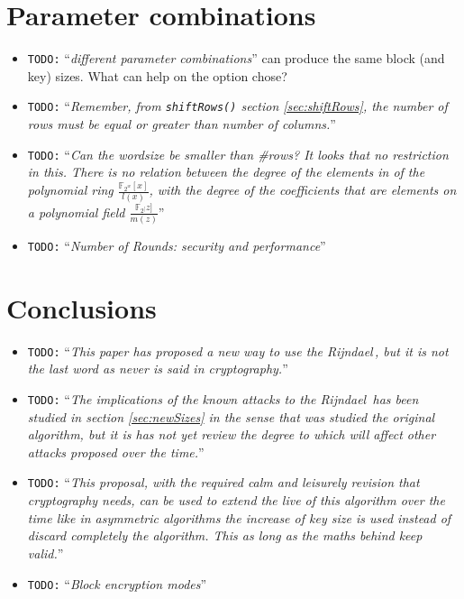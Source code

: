 \documentclass[10pt,a4paper,twoside]{llncs}
\newcommand{\todo}[1]{\texttt{\color{red}TODO:} ``\emph{#1}''}
\newcommand{\rijndael}{\emph{Rijndael}}
\newcommand{\Fpn}[2]{\ensuremath{\mathbb{F}_{#1^#2}}}
\begin{document}
\section{Parameter combinations}\label{sec:parameterCombinations}
\begin{itemize}
 \item \todo{different parameter combinations} can produce the same block (and key) sizes. What can help on the option chose?
 \item \todo{Remember, from {\tt shiftRows()} section \ref{sec:shiftRows}, the number of rows must be equal or greater than number of columns.}
 \item \todo{Can the wordsize be smaller than \#rows? It looks that no restriction in this. There is no relation between the degree of the elements in of the polynomial ring $\frac{\Fpn{2}{w}[x]}{l(x)}$, with the degree of the coefficients that are elements on a polynomial field $\frac{\Fpn{2}[z]}{m(z)}$}
 \item \todo{Number of Rounds: security and performance}
\end{itemize}

\section{Conclusions}\label{sec:conclusion}
\begin{itemize}
    \item \todo{This paper has proposed a new way to use the \rijndael\,, but it is not the last word as never is said in cryptography.}
    \item \todo{The implications of the known attacks to the \rijndael\, has been studied in section \ref{sec:newSizes} in the sense that was studied the original algorithm, but it is has not yet review the degree to which will affect other attacks proposed over the time.}
    \item \todo{This proposal, with the required calm and leisurely revision that cryptography needs, can be used to extend the live of this algorithm over the time like in asymmetric algorithms the increase of key size is used instead of discard completely the algorithm. This as long as the maths behind keep valid.}
    \item \todo{Block encryption modes}
\end{itemize}

\end{document}
